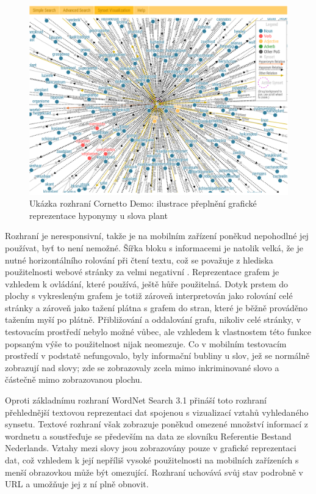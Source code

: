 \documentclass[a4paper, 11pt, oneside]{book}
\newcommand\ex{\textsf}
\begin{document}
				\begin{figure}[h]
					\centering
					\includegraphics[width=1.0\textwidth]{wncorplant.png}
					\caption{Ukázka rozhraní Cornetto Demo: ilustrace přeplnění grafické reprezentace hyponymy u slova \ex{plant}}
					\label{fig:wncorplant}
				\end{figure}

				Rozhraní je neresponsivní, takže je na mobilním zařízení poněkud nepohodlné jej používat, byť to není nemožné. Šířka bloku s informacemi je natolik velká, že je nutné horizontálního rolování při čtení textu, což se považuje z hlediska použitelnosti webové stránky za velmi negativní \parencite{nn2005scrollbar, richards2004web}. Reprezentace grafem je vzhledem k ovládání, které používá, ještě hůře použitelná. Dotyk prstem do plochy s vykresleným grafem je totiž zároveň interpretován jako rolování celé stránky a zároveň jako tažení plátna s grafem do stran, které je běžně prováděno tažením myší po plátně. Přibližování a oddalování grafu, nikoliv celé stránky, v testovacím prostředí nebylo možné vůbec, ale vzhledem k vlastnostem této funkce popsaným výše to použitelnost nijak neomezuje. Co v mobilním testovacím prostředí v podstatě nefungovalo, byly informační bubliny u slov, jež se normálně zobrazují nad slovy; zde se zobrazovaly zcela mimo inkriminované slovo a částečně mimo zobrazovanou plochu.

				Oproti základnímu rozhraní WordNet Search 3.1 přináší toto rozhraní přehlednější textovou reprezentaci dat spojenou s vizualizací vztahů vyhledaného synsetu. Textové rozhraní však zobrazuje poněkud omezené množství informací z wordnetu a soustřeďuje se především na data ze slovníku Referentie Bestand Nederlands. Vztahy mezi slovy jsou zobrazovány pouze v grafické reprezentaci dat, což vzhledem k její nepříliš vysoké použitelnosti na mobilních zařízeních s menší obrazovkou může být omezující. Rozhraní uchovává svůj stav podrobně v URL a umožňuje jej z ní plně obnovit.
\end{document}
